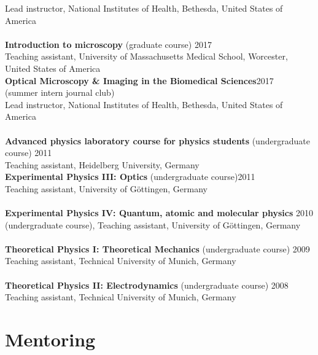 \documentclass[margin,line]{res}
\begin{document}
\begin{resume}
Lead instructor, National Institutes of Health, Bethesda, United States of America \\
\vspace*{-3mm}\\
{\bf Introduction to microscopy} (graduate course) \hfill {2017}\\
Teaching assistant, University of Massachusetts Medical School, Worcester, \\
United States of America\\
{\bf Optical Microscopy \& Imaging in the Biomedical Sciences}\hfill {2017}\\
 (summer intern journal club) \\
 Lead instructor, National Institutes of Health, Bethesda, United States of America \\
\vspace*{-3mm}\\
{\bf Advanced physics laboratory course for physics students} (undergraduate course) \hfill {2011}\\
Teaching assistant, Heidelberg University, Germany\\
{\bf Experimental Physics III: Optics}  (undergraduate course)\hfill {2011}\\
Teaching assistant, University of Göttingen, Germany \\
\vspace*{-3mm}\\
{\bf Experimental Physics IV: Quantum, atomic and molecular physics}  \hfill {2010}\\
(undergraduate course), Teaching assistant, University of Göttingen, Germany\\
\vspace*{-3mm}\\
{\bf Theoretical Physics I: Theoretical Mechanics} (undergraduate course) \hfill {2009}\\
Teaching assistant, Technical University of Munich, Germany\\
\vspace*{-3mm}\\
{\bf Theoretical Physics II: Electrodynamics} (undergraduate course) \hfill {2008}\\
Teaching assistant, Technical University of Munich, Germany\\


\section{\sc Mentoring}


\end{resume}
\end{document}
